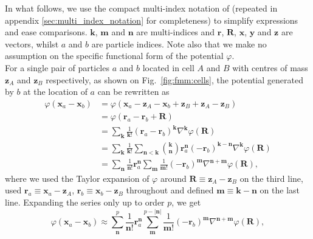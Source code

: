 In what follows, we use the compact multi-index notation of
\cite{Dehnen2014} (repeated in appendix \ref{sec:multi_index_notation}
for completeness) to simplify expressions and ease
comparisons. $\mathbf{k}$, $\mathbf{m}$ and $\mathbf{n}$ are
multi-indices and $\mathbf{r}$, $\mathbf{R}$, $\mathbf{x}$,
$\mathbf{y}$ and $\mathbf{z}$ are vectors, whilst $a$ and $b$ are
particle indices. Note also that we make no assumption on the specific
functional form of the potential $\varphi$.\\
For a single pair of particles $a$ and $b$ located in cell $A$ and $B$
with centres of mass $\mathbf{z}_A$ and $\mathbf{z}_B$ respectively,
as shown on Fig.~\ref{fig:fmm:cells}, the potential generated by $b$
at the location of $a$ can be rewritten as
\begin{align}
  \varphi(\mathbf{x}_a - \mathbf{x}_b)
  &= \varphi\left(\mathbf{x}_a - \mathbf{z}_A - \mathbf{x}_b +
  \mathbf{z}_B + \mathbf{z}_A - \mathbf{z}_B\right)  \nonumber \\
  &= \varphi\left(\mathbf{r}_a - \mathbf{r}_b + \mathbf{R}\right)
  \nonumber \\
  &= \sum_\mathbf{k} \frac{1}{\mathbf{k}!} \left(\mathbf{r}_a -
  \mathbf{r}_b\right)^{\mathbf{k}} \nabla^{\mathbf{k}}\varphi(\mathbf{R})
  \nonumber \\
  &= \sum_\mathbf{k} \frac{1}{\mathbf{k}!} \sum_{\mathbf{n} <
    \mathbf{k}} \binom{\mathbf{k}}{\mathbf{n}} \mathbf{r}_a^{\mathbf{n}}
  \left(-\mathbf{r}_b\right)^{\mathbf{k} - \mathbf{n}}
  \nabla^{\mathbf{k}}\varphi(\mathbf{R})\nonumber \\
  &= \sum_\mathbf{n} \frac{1}{\mathbf{n}!} \mathbf{r}_a^{\mathbf{n}}
  \sum_\mathbf{m} \frac{1}{\mathbf{m}!}
  \left(-\mathbf{r}_b\right)^\mathbf{m} \nabla^{\mathbf{n}+\mathbf{m}} \varphi(\mathbf{R}),
  \label{eq:fmm:expansion}
\end{align}
where we used the Taylor expansion of $\varphi$ around $\mathbf{R} \equiv
\mathbf{z}_A - \mathbf{z}_B$ on the third line, used $\mathbf{r}_a
\equiv \mathbf{x}_a - \mathbf{z}_A$, $\mathbf{r}_b \equiv \mathbf{x}_b
- \mathbf{z}_B$ throughout and defined $\mathbf{m} \equiv
\mathbf{k}-\mathbf{n}$ on the last line. Expanding the series only up
to order $p$, we get
\begin{equation}
  \varphi(\mathbf{x}_a - \mathbf{x}_b) \approx \sum_{\mathbf{n}}^{p}
  \frac{1}{\mathbf{n}!} \mathbf{r}_a^{\mathbf{n}} \sum_{\mathbf{m}}^{p
    -|\mathbf{n}|} 
  \frac{1}{\mathbf{m}!} \left(-\mathbf{r}_b\right)^\mathbf{m}
  \nabla^{\mathbf{n}+\mathbf{m}} \varphi(\mathbf{R}),
  \label{eq:fmm:fmm_one_part}
\end{equation}
